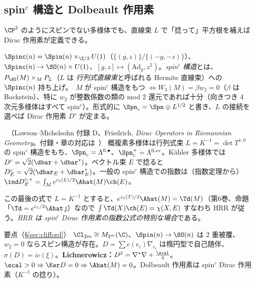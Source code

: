 \subsection{spin$^c$ 構造と Dolbeault 作用素}
$\CP^2$ のようにスピンでない多様体でも、直線束 $L$ で「捻って」平方根を補えば Dirac 作用素が定義できる。
\begin{defn}[spin$^c$ 構造]\label{def:spinc}
$\Spinc(n)=\Spin(n)\times_{\Z/2}U(1)$（$\{(g,z)\}/\{(-g,-z)\}$）、$\Spinc(n)\to\SO(n)\times U(1)$、$[g,z]\mapsto(\mathrm{Ad}_g,z^2)$。\emph{spin$^c$ 構造}とは、$P_{\SO}(M)\times_M P_L$（$L$ は \emph{行列式直線束}と呼ばれる Hermite 直線束）への $\Spinc(n)$ 持ち上げ。\tC\ $M$ が spin$^c$ 構造をもつ $\iff W_3(M)=\beta w_2=0$（$\beta$ は Bockstein）、特に $w_2$ が整数係数の類の mod 2 還元であれば十分（向きつき 4 次元多様体はすべて spin$^c$）。形式的に $\Spn_c=\Spn\otimes L^{1/2}$ と書き、$L$ の接続を選べば Dirac 作用素 $D^c$ が定まる。
\end{defn}
\begin{prop}\label{prop:dolbeaultDirac}\tC\ （Lawson--Michelsohn 付録 D、Friedrich, \emph{Dirac Operators in Riemannian Geometry}。付録・章の対応は\tQ\ ）
概複素多様体は行列式束 $L=K^{-1}=\det T^{1,0}$ の spin$^c$ 構造をもち、$\Spn_c=\Lambda^{0,\bullet}$、$\Spn_c^+=\Lambda^{0,{\rm ev}}$。Kähler 多様体では $D^c=\sqrt2(\dbar+\dbar^*)$。ベクトル束 $E$ で捻ると $D^c_E=\sqrt2(\dbar_E+\dbar_E^*)$。一般の spin$^c$ 構造での指数は（指数定理から）$\ind D^{c,+}_E=\int_M e^{c_1(L)/2}\Ahat(M)\ch(E)$。
\end{prop}
この最後の式で $L=K^{-1}$ とすると、$e^{c_1(T)/2}\Ahat(M)=\Td(M)$（第6巻、命題「$\Td=e^{c_1/2}\Ahat$」）なので $\int\Td(X)\ch(E)=\chi(X,E)$ すなわち HRR が従う。\emph{HRR は spin$^c$ Dirac 作用素の指数公式の特別な場合}である。

\begin{keybox}{要点（\S\ref{sec:clifford}）}
$\Cl_{2m}\cong M_{2^m}(\C)$、$\Spin(n)\to\SO(n)$ は 2 重被覆、$w_2=0$ ならスピン構造が存在。$D=\sum c(e_i)\nabla_{e_i}$ は楕円型で自己随伴、$\sigma(D)=ic(\xi)$。\textbf{Lichnerowicz：}$D^2=\nabla^*\nabla+\frac{\scal}4$。$\scal>0\Rightarrow\Ker D=0\Rightarrow\Ahat(M)=0$。Dolbeault 作用素は spin$^c$ Dirac 作用素（$K^{-1}$ の捻り）。
\end{keybox}
